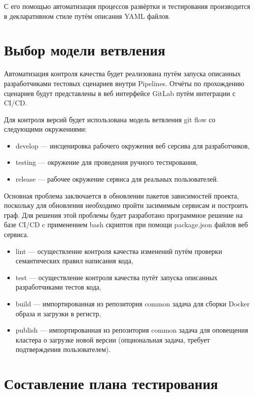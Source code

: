 С его помощью автоматизация процессов развёртки и тестирования производится в декларативном стиле путём описания YAML файлов.

\section{Выбор модели ветвления}

Автоматизация контроля качества будет реализована путём запуска описанных разработчиками тестовых сценариев внутри Pipelines.
Отчёты по прохождению сценариев будут представлены в веб интерфейсе GitLab путём интеграции с CI/CD.

Для контроля версий будет использована модель ветвления git flow со следующими окружениями:

\begin{itemize}
    \item develop --- инсценировка рабочего окружения веб серсива для разработчиков,
    \item testing --- окружение для проведения ручного тестирования,
    \item release --- рабочее окружение сервиса для реальных пользователей.
\end{itemize}

Основная проблема заключается в обновлении пакетов зависимостей проекта, поскольку для обновления необходимо пройти засимимым сервисам и построить граф.
Для решения этой проблемы будет разработано программное решение на базе CI/CD c применением bash скриптов при помощи package.json файлов веб сервиса.

\begin{itemize}
    \item lint --- осуществление контроля качества изменений путём проверки семантических правил написания кода,
    \item test --- осуществление контроля качества путёт запуска описанных разработчиками тестов кода,
    \item build --- импортированная из репозитория common задача для сборки Docker образа и загрузки в регистр,
    \item publish --- импортированная из репозитория common задача для оповещения кластера о загрузке новой версии (опциональная задача, требует подтверждения пользователем).
\end{itemize}

\section{Составление плана тестирования}

